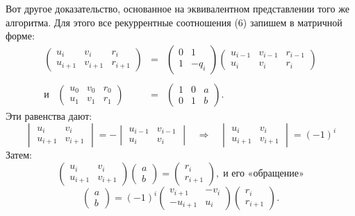 \documentclass{mai_book}
\begin{document}
Вот другое доказательство, основанное на эквивалентном предста­влении того же алгоритма. Для этого все рекуррентные соотноше­ния (6) запишем в матричной форме:
$$\begin{array}{rcl}
\begin{pmatrix}
u_{i} & v_{i} & r_{i}\\
u_{i+1} & v_{i+1} & r_{i+1}
\end{pmatrix}&=&
\begin{pmatrix}
0 & 1\\
1 & -q_{i}
\end{pmatrix}
\begin{pmatrix}
u_{i-1} & v_{i-1} & r_{i-1}\\
u_{i} & v_{i} & r_{i}
\end{pmatrix}\\
\;\\
\text{и}\;\;\;
\begin{pmatrix}
u_{0} & v_{0} & r_{0}\\
u_{1} & v_{1} & r_{1}
\end{pmatrix}&=&
\begin{pmatrix}
1 & 0 & a\\
0 & 1 & b
\end{pmatrix}.
\end{array}$$
Эти равенства дают:
$$\begin{vmatrix}
u_{i} & v_{i}\\
u_{i+1} & v_{i+1}
\end{vmatrix} =-
\begin{vmatrix}
u_{i-1} & v_{i-1}\\
u_{i} & v_{i}
\end{vmatrix}\;\;\;\Rightarrow\;\;\;
\begin{vmatrix}
u_{i} & v_{i}\\
u_{i+1} & v_{i+1}
\end{vmatrix}=(-1)^i$$
Затем:
$$\begin{pmatrix}
u_{i} & v_{i}\\
u_{i+1} & v_{i+1}
\end{pmatrix}
\begin{pmatrix}
a\\
b
\end{pmatrix}=
\begin{pmatrix}
r_{i}\\
r_{i+1}
\end{pmatrix},\;\text{и его «обращение»}$$
\newpage
$$\begin{pmatrix}
a\\
b
\end{pmatrix}
=(-1)^i
\begin{pmatrix}
v_{i+1} & -v_{i}\\
-u_{i+1} & u_{i}
\end{pmatrix}
\begin{pmatrix}
r_{i}\\
r_{i+1}
\end{pmatrix}.$$
\end{document}

